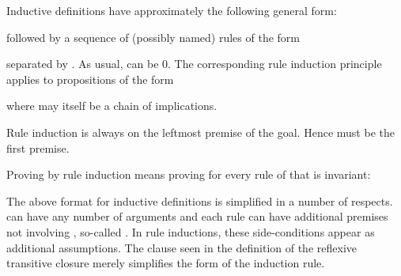 \begin{isabellebody}
\begin{isamarkuptext}
Inductive definitions have approximately the following general form:
\begin{quote}
  
\end{quote}
followed by a sequence of (possibly named) rules of the form
\begin{quote}
\end{quote}
separated by . As usual,  can be 0.
The corresponding rule induction principle
 applies to propositions of the form
\begin{quote}
\end{quote}
where  may itself be a chain of implications.
\begin{warn}
Rule induction is always on the leftmost premise of the goal.
Hence  must be the first premise.
\end{warn}
Proving  by rule induction means proving
for every rule of  that  is invariant:
\begin{quote}
\end{quote}

The above format for inductive definitions is simplified in a number of
respects.  can have any number of arguments and each rule can have
additional premises not involving , so-called . In rule inductions, these side-conditions appear as additional
assumptions. The  clause seen in the definition of the reflexive
transitive closure merely simplifies the form of the induction rule.%
\end{isamarkuptext}%
\isamarkuptrue%
%
\isadelimtheory
%
\endisadelimtheory
%
\isatagtheory
%
\endisatagtheory
{\isafoldtheory}%
%
\isadelimtheory
%
\endisadelimtheory
\end{isabellebody}%
